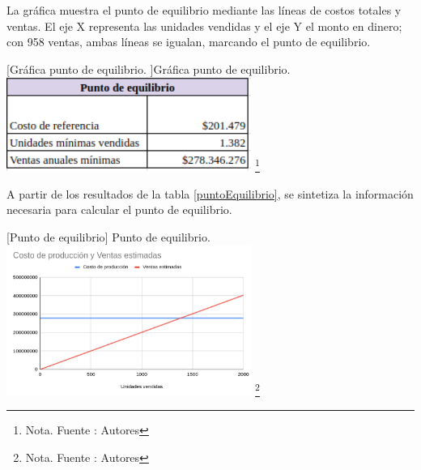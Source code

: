 La gráfica muestra el punto de equilibrio mediante las líneas de costos totales y ventas. El eje X representa las unidades vendidas y el eje Y el monto en dinero; con 958 ventas, ambas líneas se igualan, marcando el punto de equilibrio.

\vspace{2mm}
\begin{minipage}{0.9\textwidth}
\centering
{}[{Gráfica punto de equilibrio. }]{Gráfica punto de equilibrio. }
\label{graficaEquilibrio}
\includegraphics[width=0.6\textwidth]{Content/Images/AF/PuntoDeEquilibrio_PuntoDeEqui.png}
\footnote{Nota. \textup{Fuente : Autores}}
\end{minipage}

A partir de los resultados de la tabla \ref{puntoEquilibrio}, se sintetiza la información necesaria para calcular el punto de equilibrio.

\vspace{2mm}
\begin{minipage}{0.9\textwidth}
\centering
{}[{Punto de equilibrio}]{ Punto de equilibrio. }
\label{puntoEquilibrio}
\includegraphics[width=0.6\textwidth]{Content/Images/AF/PuntoDeEquilibrio_CostosYVentas.png}
\footnote{Nota. \textup{Fuente : Autores}}
\end{minipage}